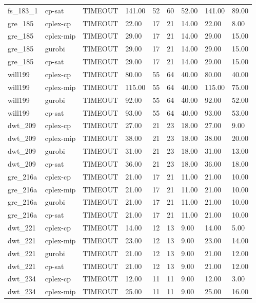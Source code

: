 \begin{tabular}{lllllllll}
fs\_183\_1 & cp-sat & TIMEOUT & 141.00 & 52 & 60 & 52.00 & 141.00 & 89.00 \\
gre\_185 & cplex-cp & TIMEOUT & 22.00 & 17 & 21 & 14.00 & 22.00 & 8.00 \\
gre\_185 & cplex-mip & TIMEOUT & 29.00 & 17 & 21 & 14.00 & 29.00 & 15.00 \\
gre\_185 & gurobi & TIMEOUT & 29.00 & 17 & 21 & 14.00 & 29.00 & 15.00 \\
gre\_185 & cp-sat & TIMEOUT & 29.00 & 17 & 21 & 14.00 & 29.00 & 15.00 \\
will199 & cplex-cp & TIMEOUT & 80.00 & 55 & 64 & 40.00 & 80.00 & 40.00 \\
will199 & cplex-mip & TIMEOUT & 115.00 & 55 & 64 & 40.00 & 115.00 & 75.00 \\
will199 & gurobi & TIMEOUT & 92.00 & 55 & 64 & 40.00 & 92.00 & 52.00 \\
will199 & cp-sat & TIMEOUT & 93.00 & 55 & 64 & 40.00 & 93.00 & 53.00 \\
dwt\_209 & cplex-cp & TIMEOUT & 27.00 & 21 & 23 & 18.00 & 27.00 & 9.00 \\
dwt\_209 & cplex-mip & TIMEOUT & 38.00 & 21 & 23 & 18.00 & 38.00 & 20.00 \\
dwt\_209 & gurobi & TIMEOUT & 31.00 & 21 & 23 & 18.00 & 31.00 & 13.00 \\
dwt\_209 & cp-sat & TIMEOUT & 36.00 & 21 & 23 & 18.00 & 36.00 & 18.00 \\
gre\_216a & cplex-cp & TIMEOUT & 21.00 & 17 & 21 & 11.00 & 21.00 & 10.00 \\
gre\_216a & cplex-mip & TIMEOUT & 21.00 & 17 & 21 & 11.00 & 21.00 & 10.00 \\
gre\_216a & gurobi & TIMEOUT & 21.00 & 17 & 21 & 11.00 & 21.00 & 10.00 \\
gre\_216a & cp-sat & TIMEOUT & 21.00 & 17 & 21 & 11.00 & 21.00 & 10.00 \\
dwt\_221 & cplex-cp & TIMEOUT & 14.00 & 12 & 13 & 9.00 & 14.00 & 5.00 \\
dwt\_221 & cplex-mip & TIMEOUT & 23.00 & 12 & 13 & 9.00 & 23.00 & 14.00 \\
dwt\_221 & gurobi & TIMEOUT & 21.00 & 12 & 13 & 9.00 & 21.00 & 12.00 \\
dwt\_221 & cp-sat & TIMEOUT & 21.00 & 12 & 13 & 9.00 & 21.00 & 12.00 \\
dwt\_234 & cplex-cp & TIMEOUT & 12.00 & 11 & 11 & 9.00 & 12.00 & 3.00 \\
dwt\_234 & cplex-mip & TIMEOUT & 25.00 & 11 & 11 & 9.00 & 25.00 & 16.00 \\

\end{tabular}
